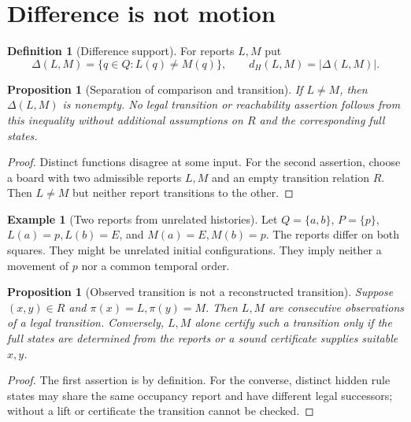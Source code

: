 \documentclass[11pt]{article}
\newtheorem{proposition}[theorem]{Proposition}
\theoremstyle{definition}
\newtheorem{definition}[theorem]{Definition}
\newtheorem{example}[theorem]{Example}
\begin{document}
\section{Difference is not motion}
\begin{definition}[Difference support]
For reports $L,M$ put
\[
\Delta(L,M)=\{q\in Q:L(q)\ne M(q)\},\qquad
d_H(L,M)=|\Delta(L,M)|.
\]
\end{definition}
\begin{proposition}[Separation of comparison and transition]
If $L\ne M$, then $\Delta(L,M)$ is nonempty. No legal transition or reachability assertion follows from this inequality without additional assumptions on $R$ and the corresponding full states.
\end{proposition}
\begin{proof}
Distinct functions disagree at some input. For the second assertion, choose a board with two admissible reports $L,M$ and an empty transition relation $R$. Then $L\ne M$ but neither report transitions to the other.
\end{proof}
\begin{example}[Two reports from unrelated histories]
Let $Q=\{a,b\}$, $P=\{p\}$, $L(a)=p,L(b)=E$, and $M(a)=E,M(b)=p$. The reports differ on both squares. They might be unrelated initial configurations. They imply neither a movement of $p$ nor a common temporal order.
\end{example}
\begin{proposition}[Observed transition is not a reconstructed transition]
Suppose $(x,y)\in R$ and $\pi(x)=L,\pi(y)=M$. Then $L,M$ are consecutive \emph{observations} of a legal transition. Conversely, $L,M$ alone certify such a transition only if the full states are determined from the reports or a sound certificate supplies suitable $x,y$.
\end{proposition}
\begin{proof}
The first assertion is by definition. For the converse, distinct hidden rule states may share the same occupancy report and have different legal successors; without a lift or certificate the transition cannot be checked.
\end{proof}
\end{document}
